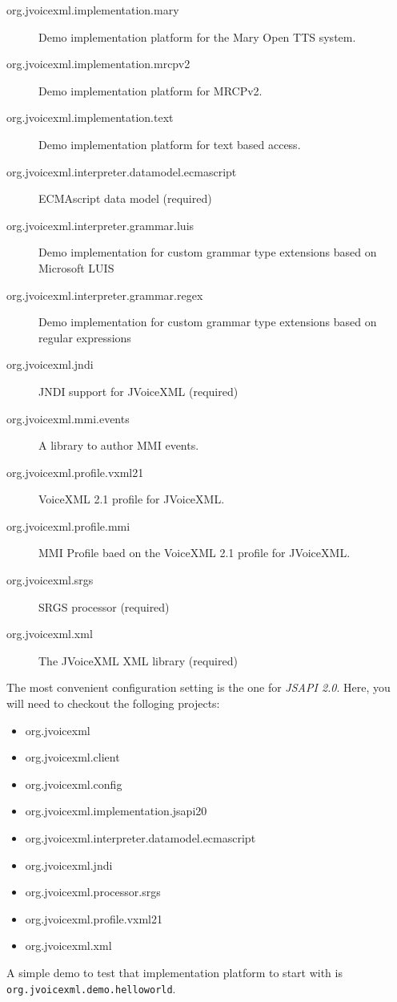 \documentclass[11pt,a4paper]{article}
\begin{document}
\begin{description}
\item[org.jvoicexml.implementation.mary] Demo implementation platform for
the Mary Open TTS system.
\item[org.jvoicexml.implementation.mrcpv2] Demo implementation platform for
MRCPv2.
\item[org.jvoicexml.implementation.text] Demo implementation platform for
text based access.
\item[org.jvoicexml.interpreter.datamodel.ecmascript] ECMAscript data model
(required)
\item[org.jvoicexml.interpreter.grammar.luis] Demo implementation for custom
grammar type extensions based on Microsoft LUIS
\item[org.jvoicexml.interpreter.grammar.regex] Demo implementation for custom
grammar type extensions based on regular expressions
\item[org.jvoicexml.jndi] JNDI support for JVoiceXML (required)
\item[org.jvoicexml.mmi.events] A library to author MMI events.
\item[org.jvoicexml.profile.vxml21] VoiceXML 2.1 profile for JVoiceXML.
\item[org.jvoicexml.profile.mmi] MMI Profile baed on the VoiceXML 2.1 profile for JVoiceXML.
\item[org.jvoicexml.srgs] SRGS processor (required)
\item[org.jvoicexml.xml] The JVoiceXML XML library (required)
\end{description}

The most convenient configuration setting is the one for \emph{JSAPI 2.0}. Here,
you will need to checkout the folloging projects:
\begin{itemize}
  \item org.jvoicexml
  \item org.jvoicexml.client
  \item org.jvoicexml.config
  \item org.jvoicexml.implementation.jsapi20
  \item org.jvoicexml.interpreter.datamodel.ecmascript
  \item org.jvoicexml.jndi
  \item org.jvoicexml.processor.srgs
  \item org.jvoicexml.profile.vxml21
  \item org.jvoicexml.xml
\end{itemize}

A simple demo to test that implementation platform to start with is
\lstinline{org.jvoicexml.demo.helloworld}.
\end{document}
